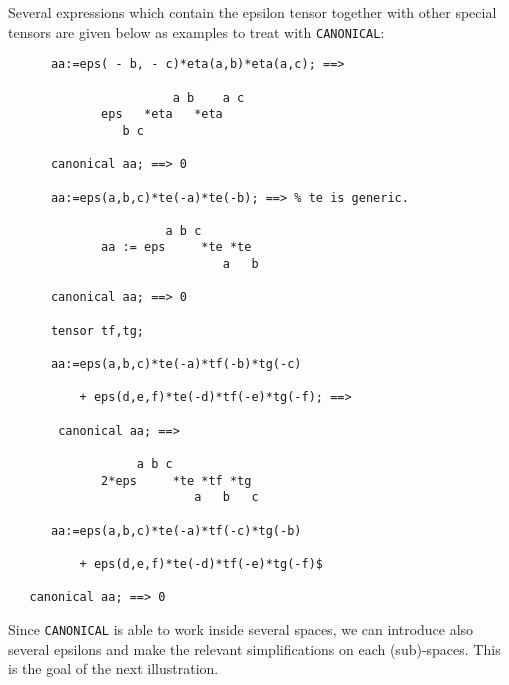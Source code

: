Several expressions which contain the  epsilon tensor together
with other special tensors are given below as examples to treat
with \texttt{CANONICAL}:
\begin{verbatim}
      aa:=eps( - b, - c)*eta(a,b)*eta(a,c); ==>

                       a b    a c
             eps   *eta   *eta
                b c

      canonical aa; ==> 0

      aa:=eps(a,b,c)*te(-a)*te(-b); ==> % te is generic.

                      a b c
             aa := eps     *te *te
                              a   b

      canonical aa; ==> 0

      tensor tf,tg;

      aa:=eps(a,b,c)*te(-a)*tf(-b)*tg(-c)

          + eps(d,e,f)*te(-d)*tf(-e)*tg(-f); ==>

       canonical aa; ==>

                  a b c
             2*eps     *te *tf *tg
                          a   b   c

      aa:=eps(a,b,c)*te(-a)*tf(-c)*tg(-b)

          + eps(d,e,f)*te(-d)*tf(-e)*tg(-f)$

   canonical aa; ==> 0
\end{verbatim}
Since \texttt{CANONICAL} is able to work inside several
spaces, we can introduce also several epsilons and make the relevant
simplifications on each (sub)-spaces. This is the goal of the
next illustration.
